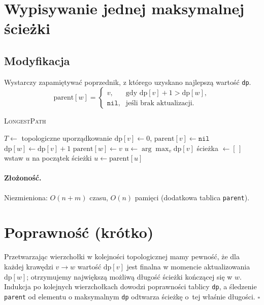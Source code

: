 \documentclass[11pt,a4paper]{article}
\begin{document}
\section{Wypisywanie jednej maksymalnej ścieżki}

\subsection*{Modyfikacja}
Wystarczy zapamiętywać
poprzednik, z którego
uzyskano najlepszą wartość \texttt{dp}.
\[
\text{parent}[w]=
\begin{cases}
v, &\text{gdy } \text{dp}[v]+1>\text{dp}[w],\\
\texttt{nil}, &\text{jeśli brak aktualizacji.}
\end{cases}
\]

\begin{algorithm}[H]
\caption{\textsc{LongestPath}}
\begin{algorithmic}[1]
\State $T\gets$ topologiczne uporządkowanie
 $\text{dp}[v]\gets0$,\; $\text{parent}[v]\gets\texttt{nil}$ \EndFor
{}
         \State $\text{dp}[w]\gets\text{dp}[v]+1$
         \State $\text{parent}[w]\gets v$
      \EndIf
   \EndFor
\EndFor
\State $u\gets\arg\max_{v}\text{dp}[v]$      
\State ścieżka $\gets[\,]$
   \State wstaw $u$ na początek ścieżki
   \State $u\gets\text{parent}[u]$
\EndWhile
\State {}
\end{algorithmic}
\end{algorithm}

\paragraph{Złożoność.}
Niezmieniona: $O(n+m)$ czasu, $O(n)$ pamięci  
(dodatkowa tablica \texttt{parent}).

\section*{Poprawność (krótko)}

Przetwarzając wierzchołki w kolejności topologicznej
mamy pewność, że dla każdej krawędzi
\(v\!\to\!w\) wartość \(\text{dp}[v]\) jest finalna
w momencie aktualizowania \(\text{dp}[w]\);
otrzymujemy największą możliwą długość ścieżki
kończącej się w $w$.  
Indukcja po kolejnych wierzchołkach
dowodzi poprawności tablicy \texttt{dp},
a śledzenie \texttt{parent}
od elementu o maksymalnym \texttt{dp}
odtwarza ścieżkę o~tej właśnie długości.
\hfill$\square$
\end{document}

